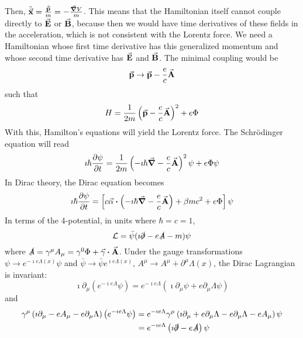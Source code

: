 \documentclass[a4paper,twoside,master.tex]{subfiles}
\begin{document}
Then, $ \ddot{\va{x}} = \frac{\dot{\va{p}}}{m} = - \frac{\grad{V}}{m} $. This means that the Hamiltonian itself cannot couple directly to $ \va{E} $ or $ \va{B} $, because then we would have time derivatives of these fields in the acceleration, which is not consistent with the Lorentz force. We need a Hamiltonian whose first time derivative has this generalized momentum and whose second time derivative has $ \va{E} $ and $ \va{B} $. The minimal coupling would be
\begin{equation}
    \va{p} \to \va{p} - \frac{e}{c} \va{A}
\end{equation}
such that
\begin{equation}
    H = \frac{1}{2m} \left( \va{p} - \frac{e}{c} \va{A} \right)^2 + e \Phi
\end{equation}
With this, Hamilton's equations will yield the Lorentz force. The Schr\"odinger equation will read
\begin{equation}
    \imath \hbar \pdv{\psi}{t} = \frac{1}{2m} \left( - \imath \hbar \grad - \frac{e}{c} \va{A} \right)^2 \psi + e \Phi \psi
\end{equation}
In Dirac theory, the Dirac equation becomes
\begin{equation}
    \imath \hbar \pdv{\psi}{t} = \left[ c \va{\alpha} \vdot \left( - \imath \hbar \grad - \frac{e}{c} \va{A} \right) + \beta m c^2 + e \Phi \right] \psi
\end{equation}
In terms of the 4-potential, in units where $ \hbar = c = 1 $,
\begin{equation}
    \mathcal{L} = \bar{\psi} (\imath \slashed{\partial} - e \slashed{A} - m) \psi
\end{equation}
where $ \slashed{A} = \gamma^{\mu} A_{\mu} = \gamma^0 \Phi + \va{\gamma} \vdot \va{A} $. Under the gauge transformations $ \psi \to e^{- \imath e \Lambda(x)} \psi $ and $ \bar{\psi} \to \bar{\psi} e^{\imath e \Lambda(x)} $, $ A^{\mu} \to A^{\mu} + \partial^{\mu} \Lambda(x) $, the Dirac Lagrangian is invariant:
\begin{equation}
    \imath \partial_{\mu} (e^{- \imath e \Lambda} \psi)= e^{- \imath e \Lambda} \left( \imath \partial_{\mu} \psi + e \partial_{\mu} \Lambda \psi \right)
\end{equation}
and
\begin{align}
    \gamma^{\mu} \left( \imath \partial_{\mu} - e A_{\mu} - e \partial_{\mu} \Lambda \right) \left( e^{- \imath e \Lambda} \psi \right) &= e^{- \imath e \Lambda} \gamma^{\mu} \left( \imath \partial_{\mu} + e \partial_{\mu} \Lambda - e \partial_{\mu} \Lambda - e A_{\mu} \right) \psi \\
                                                                                                                                               &= e^{- \imath e \Lambda} \left( \imath \slashed{\partial} - e \slashed{A} \right) \psi
\end{align}
\end{document}
